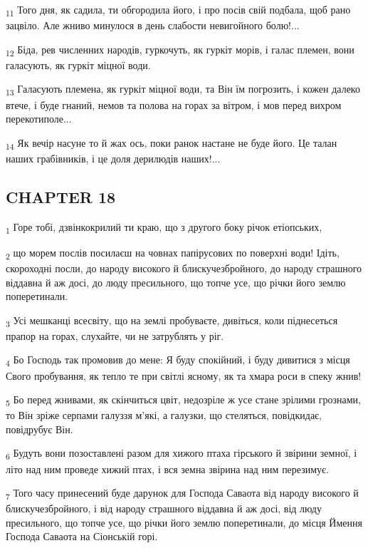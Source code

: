 \begin{tcolorbox}
\textsubscript{11} Того дня, як садила, ти обгородила його, і про посів свій подбала, щоб рано зацвіло. Але жниво минулося в день слабости невигойного болю!...
\end{tcolorbox}
\begin{tcolorbox}
\textsubscript{12} Біда, рев численних народів, гуркочуть, як гуркіт морів, і галас племен, вони галасують, як гуркіт міцної води.
\end{tcolorbox}
\begin{tcolorbox}
\textsubscript{13} Галасують племена, як гуркіт міцної води, та Він їм погрозить, і кожен далеко втече, і буде гнаний, немов та полова на горах за вітром, і мов перед вихром перекотиполе...
\end{tcolorbox}
\begin{tcolorbox}
\textsubscript{14} Як вечір насуне то й жах ось, поки ранок настане не буде його. Це талан наших грабівників, і це доля дерилюдів наших!...
\end{tcolorbox}
\subsection{CHAPTER 18}
\begin{tcolorbox}
\textsubscript{1} Горе тобі, дзвінкокрилий ти краю, що з другого боку річок етіопських,
\end{tcolorbox}
\begin{tcolorbox}
\textsubscript{2} що морем послів посилаєш на човнах папірусових по поверхні води! Ідіть, скороходні посли, до народу високого й блискучезбройного, до народу страшного віддавна й аж досі, до люду пресильного, що топче усе, що річки його землю поперетинали.
\end{tcolorbox}
\begin{tcolorbox}
\textsubscript{3} Усі мешканці всесвіту, що на землі пробуваєте, дивіться, коли піднесеться прапор на горах, слухайте, чи не затрублять у ріг.
\end{tcolorbox}
\begin{tcolorbox}
\textsubscript{4} Бо Господь так промовив до мене: Я буду спокійний, і буду дивитися з місця Свого пробування, як тепло те при світлі ясному, як та хмара роси в спеку жнив!
\end{tcolorbox}
\begin{tcolorbox}
\textsubscript{5} Бо перед жнивами, як скінчиться цвіт, недозріле ж усе стане зрілими грознами, то Він зріже серпами галуззя м'які, а галузки, що стеляться, повідкидає, повідрубує Він.
\end{tcolorbox}
\begin{tcolorbox}
\textsubscript{6} Будуть вони позоставлені разом для хижого птаха гірського й звірини земної, і літо над ним проведе хижий птах, і вся земна звірина над ним перезимує.
\end{tcolorbox}
\begin{tcolorbox}
\textsubscript{7} Того часу принесений буде дарунок для Господа Саваота від народу високого й блискучезбройного, і від народу страшного віддавна й аж досі, від люду пресильного, що топче усе, що річки його землю поперетинали, до місця Ймення Господа Саваота на Сіонській горі.
\end{tcolorbox}
